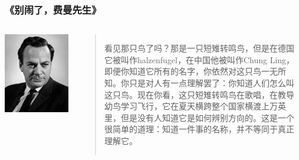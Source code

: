 \documentclass[aspectratio=169, 14pt]{beamer}
\begin{document}
\begin{frame}
    \frametitle{《别闹了，费曼先生》}
    \begin{columns}
        \includegraphics[height=0.5\paperheight]{image/feynman}
        \begin{quote}
            看见那只鸟了吗？那是一只短雉转鸣鸟，但是在德国它被叫作halzenfugel，在中国他被叫作Chung Ling，\alert{即便你知道它所有的名字，你依然对这只鸟一无所知}。你只是对人有一点理解罢了：你知道人们怎么叫这只鸟。现在你看，这只短雉转鸣鸟在歌唱，在教导幼鸟学习飞行，它在夏天横跨整个国家横渡上万英里，但是没有人知道它是如何辨别方向的。\alert{这是一个很简单的道理：知道一件事的名称，并不等同于真正理解它}。
        \end{quote} 
    \end{columns}
    

\end{frame}
\end{document}

